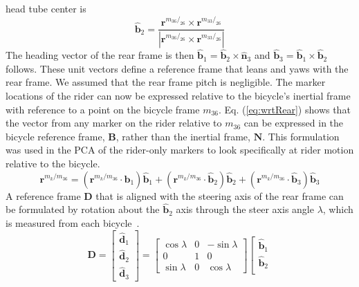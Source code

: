 \documentclass[smallextended]{svjour3}     %
\begin{document}
\begin{appendices}
head tube center is
\begin{equation}
\hat{\mathbf{b}}_2=
\frac{\mathbf{r}^{{m_{36}}/_{26}}\times\mathbf{r}^{{m_{33}}/_{26}}}
{|\mathbf{r}^{{m_{36}}/_{26}}\times\mathbf{r}^{{m_{33}}/_{26}}|}
\label{eq:b2}
\end{equation}
The heading vector of the rear frame is then
$\hat{\mathbf{b}}_1=\hat{\mathbf{b}}_2\times\hat{\mathbf{n}}_3$ and
$\hat{\mathbf{b}}_3=\hat{\mathbf{b}}_1\times\hat{\mathbf{b}}_2$ follows. These
unit vectors define a reference frame that leans and yaws with the rear frame.
We assumed that the rear frame pitch is negligible. The marker locations of the
rider can now be expressed relative to the bicycle's inertial frame with reference to a point
on the bicycle frame $m_{36}$. Eq. (\ref{eq:wrtRear}) shows that the vector from
any marker on the rider relative to $m_{36}$ can be expressed in the bicycle
reference frame, $\mathbf{B}$, rather than the inertial frame, $\mathbf{N}$.
This formulation was used in the
PCA of the rider-only markers to look specifically at rider motion relative to
the bicycle.
\begin{equation}
    \mathbf{r}^{{m_{k}}/m_{36}}=
    (\mathbf{r}^{{m_{k}}/m_{36}}\cdot\hat{\mathbf{b}}_1)\hat{\mathbf{b}}_1+
    (\mathbf{r}^{{m_{k}}/m_{36}}\cdot\hat{\mathbf{b}}_2)\hat{\mathbf{b}}_2+
    (\mathbf{r}^{{m_{k}}/m_{36}}\cdot\hat{\mathbf{b}}_3)\hat{\mathbf{b}}_3
\label{eq:wrtRear}
\end{equation}
A reference frame $\mathbf{D}$ that is aligned with the steering axis of the
rear frame can be formulated by rotation about the $\hat{\mathbf{b}}_2$ axis
through the steer axis angle $\lambda$, which is measured from each
bicycle~\cite{Moore2009a}.
\begin{equation}
    \mathbf{D}=
    \left[
    \begin{array}{c}
    \hat{\mathbf{d}}_1\\
    \hat{\mathbf{d}}_2\\
    \hat{\mathbf{d}}_3
  \end{array}
    \right]
    =
    \left[
    \begin{array}{rrr}
    \cos{\lambda} &  0 &  -\sin{\lambda}\\
    0             &  1 &  0\\
    \sin{\lambda} &  0 & \cos{\lambda}
    \end{array}
    \right]
    \left[
    \begin{array}{c}
    \hat{\mathbf{b}}_1\\
    \hat{\mathbf{b}}_2\\

\end{array}
\end{equation}
\end{appendices}
\end{document}
